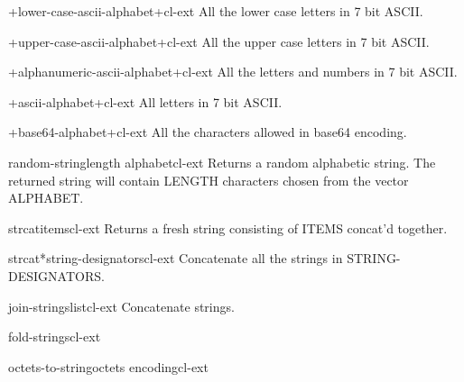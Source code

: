 \begin{constant}{+lower-case-ascii-alphabet+}{}{cl-ext}{}
  All the lower case letters in 7 bit ASCII.
\end{constant}

\begin{constant}{+upper-case-ascii-alphabet+}{}{cl-ext}{}
  All the upper case letters in 7 bit ASCII.
\end{constant}

\begin{constant}{+alphanumeric-ascii-alphabet+}{}{cl-ext}{}
  All the letters and numbers in 7 bit ASCII.
\end{constant}

\begin{constant}{+ascii-alphabet+}{}{cl-ext}{}
  All letters in 7 bit ASCII.
\end{constant}

\begin{constant}{+base64-alphabet+}{}{cl-ext}{}
  All the characters allowed in base64 encoding.
\end{constant}

\begin{function}{random-string}{\op length alphabet}{cl-ext}{}
  Returns a random alphabetic string. The returned string will contain
  LENGTH characters chosen from the vector ALPHABET.
\end{function}

\begin{function}{strcat}{\rest items}{cl-ext}{}
  Returns a fresh string consisting of ITEMS concat'd together.
\end{function}

\begin{function}{strcat*}{string-designators}{cl-ext}{}
  Concatenate all the strings in STRING-DESIGNATORS.
\end{function}

\begin{function}{join-strings}{list}{cl-ext}{}
  Concatenate strings.
\end{function}

\begin{function}{fold-strings}{}{cl-ext}{}
  
\end{function}

\begin{function}{octets-to-string}{octets encoding}{cl-ext}{}
  
\end{function}

